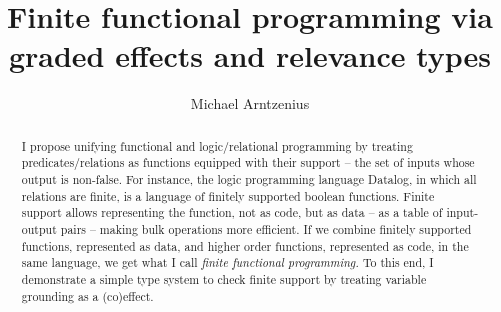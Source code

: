 \documentclass[sigplan,screen,dvipsnames,fleqn]{acmart}
\title{Finite functional programming via graded effects and relevance types}
\author{Michael Arntzenius}
\affiliation{%
  \institution{UC Berkeley}
  \city{Berkeley}
  \country{USA}
}
\newcommand{\todo}[1]{{\color{ACMRed}#1}}
\newcommand\<\;                 %
\begin{document}
\begin{abstract}
  I propose unifying functional and logic/relational programming by treating predicates/relations as functions equipped with their support -- the set of inputs whose output is non-false.
  For instance, the logic programming language Datalog, in which all relations are finite, is a language of finitely supported boolean functions.
  Finite support allows representing the function, not as code, but as data -- as a table of input-output pairs -- making bulk operations more efficient.
%
  If we combine finitely supported functions, represented as data, and higher order functions, represented as code, in the same language, we get what I call \emph{finite functional programming.}
  To this end, I demonstrate a simple type system to check finite support by treating variable grounding as a (co)effect.
\end{abstract}

\maketitle







\end{document}
